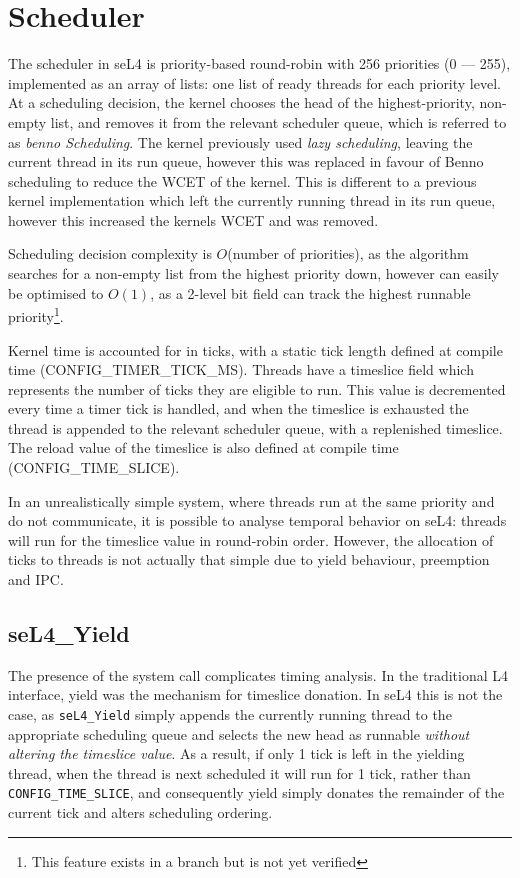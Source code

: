 \section{Scheduler}

The scheduler in seL4 is priority-based round-robin with 256 priorities (0 --- 255), implemented as an array of lists: one list of ready threads for each priority level. 
At a scheduling decision, the kernel chooses the head of the highest-priority, non-empty list, and removes it from the relevant scheduler queue, which is referred to as \emph{benno Scheduling}.
The kernel previously used \emph{lazy scheduling}, leaving the current thread in its run queue, however this was replaced in favour of Benno scheduling to reduce the WCET of the kernel. 
This is different to a previous kernel implementation which left the currently running thread in its run queue, however this increased the kernels \gls{WCET} and was removed.

Scheduling decision complexity is $O$(number of priorities), as the algorithm searches for a non-empty list from the highest priority down, however can easily be optimised to $O(1)$, as a 2-level bit field can track the highest runnable priority\footnote{This feature exists in a branch but is not yet verified}. 

Kernel time is accounted for in ticks, with a static tick length defined at compile time (CONFIG\_TIMER\_TICK\_MS).
Threads have a timeslice field which represents the number of ticks they are eligible to run. 
This value is decremented every time a timer tick is handled, and when the timeslice is exhausted the thread is appended to the relevant scheduler queue, with a replenished timeslice.
The reload value of the timeslice is also defined at compile time (CONFIG\_TIME\_SLICE).

In an unrealistically simple system, where threads run at the same priority and do not communicate, it is possible to analyse temporal behavior on seL4: threads will run for the timeslice value in round-robin order.
However, the allocation of ticks to threads is not actually that simple due to yield behaviour, preemption and \gls{IPC}. 

\subsection{seL4\_Yield}

The presence of the \yield system call complicates timing analysis.
In the traditional L4 interface, yield was the mechanism for timeslice donation. 
In seL4 this is not the case, as \texttt{seL4\_Yield} simply appends the currently running thread to the appropriate scheduling queue and selects the new head as runnable \textit{without altering the timeslice value}.
As a result, if only 1 tick is left in the yielding thread, when the thread is next scheduled it will run for 1 tick, rather than \texttt{CONFIG\_TIME\_SLICE}, and consequently yield simply donates the remainder of the current tick and alters scheduling ordering.

